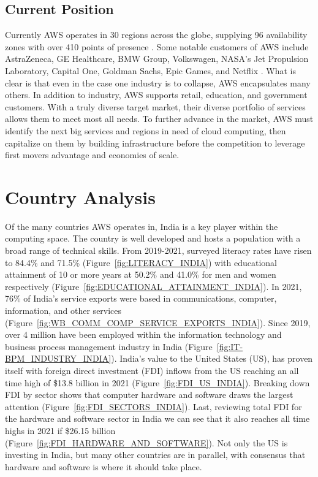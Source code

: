 \documentclass[a4paper, 12pt]{article}
\begin{document}
\subsection{Current Position}
Currently AWS operates in 30 regions across the globe, supplying 96 availability zones with over 410 points of presence \cite{AMZN_AWS_GLOBAL_INFRA}.
Some notable customers of AWS include AstraZeneca, GE Healthcare, BMW Group, Volkswagen, NASA's Jet Propulsion Laboratory, Capital One, Goldman Sachs, Epic Games, and Netflix \cite{AMZN_AWS_CLOUD_COMPUTE}.
What is clear is that even in the case one industry is to collapse, AWS encapsulates many others.
In addition to industry, AWS supports retail, education, and government customers.
With a truly diverse target market, their diverse portfolio of services allows them to meet most all needs.
To further advance in the market, AWS must identify the next big services and regions in need of cloud computing, then capitalize on them by building infrastructure before the competition to leverage first movers advantage and economies of scale.

\section{Country Analysis}
Of the many countries AWS operates in, India is a key player within the computing space.
The country is well developed and hosts a population with a broad range of technical skills.
From 2019-2021, surveyed literacy rates have risen to 84.4\% and 71.5\% (Figure~\ref{fig:LITERACY_INDIA}) with educational attainment of 10 or more years at 50.2\% and 41.0\% for men and women respectively (Figure~\ref{fig:EDUCATIONAL_ATTAINMENT_INDIA}).
In 2021, 76\% of India's service exports were based in communications, computer, information, and other services (Figure~\ref{fig:WB_COMM_COMP_SERVICE_EXPORTS_INDIA}).
Since 2019, over 4 million have been employed within the information technology and business process management industry in India (Figure~\ref{fig:IT-BPM_INDUSTRY_INDIA}).
India's value to the United States (US), has proven itself with foreign direct investment (FDI) inflows from the US reaching an all time high of \$13.8 billion in 2021 (Figure~\ref{fig:FDI_US_INDIA}).
Breaking down FDI by sector shows that computer hardware and software draws the largest attention (Figure~\ref{fig:FDI_SECTORS_INDIA}).
Last, reviewing total FDI for the hardware and software sector in India we can see that it also reaches all time highs in 2021 if \$26.15 billion (Figure~\ref{fig:FDI_HARDWARE_AND_SOFTWARE}).
Not only the US is investing in India, but many other countries are in parallel, with consensus that hardware and software is where it should take place.
\end{document}
